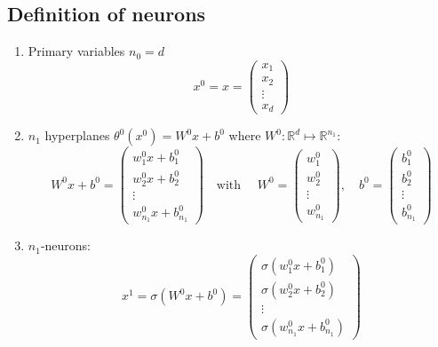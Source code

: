 \subsection{Definition of neurons}
\begin{enumerate}
	\item Primary variables $n_0=d$
	$$
	x^0=x=
	\begin{pmatrix}
	x_1\\
	x_2\\
	\vdots \\  
	x_{d}
	\end{pmatrix}
	$$
	\item $n_1$ hyperplanes $\theta^{0}(x^0) = W^0 x + b^0$ where $W^0: \mathbb{R}^{d} \mapsto \mathbb{R}^{n_1}$:
	$$
	W^0x+b^0=
	\begin{pmatrix}
	w^0_1x+b^0_1\\
	w^0_2x+b^0_2\\
	\vdots \\  
	w^0_{n_1}x+b^0_{n_1}
	\end{pmatrix}\quad \mbox{with }\quad W^0=
	\begin{pmatrix}
	w^0_1\\
	w^0_2\\
	\vdots \\  
	w^0_{n_1}
	\end{pmatrix},\quad b^0=
	\begin{pmatrix}
	b^0_1\\
	b^0_2\\
	\vdots \\  
	b^0_{n_1}
	\end{pmatrix}
	$$
	\item $n_1$-neurons:
	$$
	x^1=\sigma(W^0x+b^0)
	=\begin{pmatrix}
	\sigma(w^0_1x+b^0_1)\\
	\sigma(w^0_2x+b^0_2)\\
	\vdots \\  
	\sigma(w^0_{n_1}x+b^0_{n_1})
	\end{pmatrix}
	$$
	

\end{enumerate}
